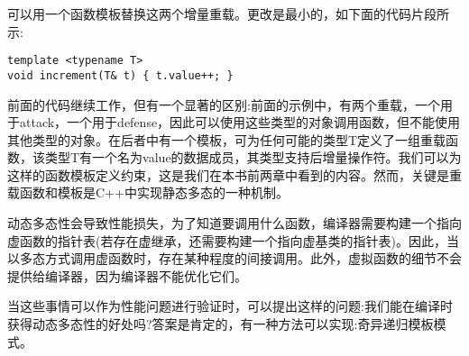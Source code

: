 可以用一个函数模板替换这两个增量重载。更改是最小的，如下面的代码片段所示:

\begin{lstlisting}[style=styleCXX]
template <typename T>
void increment(T& t) { t.value++; }
\end{lstlisting}

前面的代码继续工作，但有一个显著的区别:前面的示例中，有两个重载，一个用于attack，一个用于defense，因此可以使用这些类型的对象调用函数，但不能使用其他类型的对象。在后者中有一个模板，可为任何可能的类型T定义了一组重载函数，该类型T有一个名为value的数据成员，其类型支持后增量操作符。我们可以为这样的函数模板定义约束，这是我们在本书前两章中看到的内容。然而，关键是重载函数和模板是C++中实现静态多态的一种机制。

动态多态性会导致性能损失，为了知道要调用什么函数，编译器需要构建一个指向虚函数的指针表(若存在虚继承，还需要构建一个指向虚基类的指针表)。因此，当以多态方式调用虚函数时，存在某种程度的间接调用。此外，虚拟函数的细节不会提供给编译器，因为编译器不能优化它们。

当这些事情可以作为性能问题进行验证时，可以提出这样的问题:我们能在编译时获得动态多态性的好处吗?答案是肯定的，有一种方法可以实现:奇异递归模板模式。










































